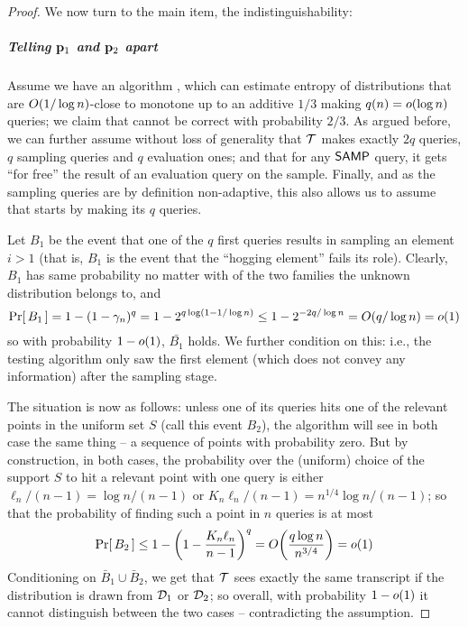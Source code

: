 \begin{proof}
\noindent We now turn to the main item, the indistinguishability:\vspace{-0.5\baselineskip}
\subparagraph{Telling $\mathbf{p}_1$ and $\mathbf{p}_2$ apart}
Assume we have an algorithm \Tester, which can estimate entropy of distributions that are $\bigO{1/\log n}$-close to monotone up to an additive $1/3$ making $q(n)=\littleO{\log n}$ queries; we claim that \Tester cannot be correct with probability $2/3$. As argued before, we can further assume without loss of generality that $\mathcal{T}$ makes exactly $2q$ queries, $q$ sampling queries and $q$ evaluation ones; and that for any ${\sf SAMP}$ query, it gets ``for free'' the result of an evaluation query on the sample. Finally, and as the sampling queries are by definition non-adaptive, this also allows us to assume that \Tester starts by making its $q$ \SAMP queries.

Let $B_1$ be the event that one of the $q$ first queries results in sampling an element $i > 1$ (that is, $B_1$ is the event that the ``hogging element'' fails its role). Clearly, $B_1$ has same probability no matter with of the two families the unknown distribution belongs to, and
\begin{equation}
  \probaOf{B_1} = 1-(1-\gamma_n)^q = 1-2^{q\log(1-1/\log n)} \leq 1-2^{-2q/\log n} = \bigO{q/\log n} = \littleO{1}
\end{equation}
so with probability $1-\littleO{1}$, $\bar{B_1}$ holds. We further condition on this: i.e., the testing algorithm only saw the first element (which does not convey any information) after the sampling stage.

The situation is now as follows: unless one of its queries hits one of the relevant points in the uniform set $S$ (call this event $B_2$), the algorithm will see in both case the same thing -- a sequence of points with probability zero. But by construction, in both cases, the probability over the (uniform) choice of the support $S$ to hit a relevant point with one query is either $\ell_n/(n-1)=\log n/(n-1)$ or $K_n\ell_n/(n-1) = n^{1/4}\log n/(n-1)$; so that the probability of finding such a point in $n$ queries is at most
\begin{equation}
  \probaOf{B_2} \leq 1-\left(1-\frac{K_n\ell_n}{n-1}\right)^q = \bigO{ \frac{q\log n}{n^{3/4}} } = \littleO{1}
\end{equation}
Conditioning on $\bar{B}_1\cup \bar{B}_2$, we get that $\mathcal{T}$ sees exactly the same transcript if the distribution is drawn from $\mathcal{D}_1$ or $\mathcal{D}_2$; so overall, with probability $1-\littleO{1}$ it cannot distinguish between the two cases -- contradicting the assumption.
\end{proof}

